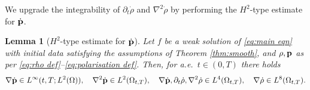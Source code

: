 \documentclass[11pt,a4paper,reqno]{amsart}
\newtheorem{lemma}[prop]{Lemma}
\theoremstyle{remark}
\theoremstyle{definition}
\numberwithin{equation}{section}
\newcommand{\p}{{\bf p}}
\begin{document}
We upgrade the integrability of $\partial_t \dot{\rho}$ and $\nabla^2\dot{\rho}$ by performing the $H^2$-type estimate for $\dot{\p}$. 

\begin{lemma}[$H^2$-type estimate for $\dot{\p}$]\label{lem:H2 dot p}
    Let $f$ be a weak solution of \eqref{eq:main eqn} with initial data satisfying the assumptions of Theorem \ref{thm:smooth}, and $\rho,\p$ as per \eqref{eq:rho def}--\eqref{eq:polarisation def}. Then, for a.e.~$t \in (0,T)$ there holds 
    \begin{equation*}
        \nabla \dot{\p} \in {L^\infty(t,T;L^2(\Omega))} , \quad \nabla^2 \dot{\p} \in {L^2(\Omega_{t,T})} , \quad \nabla \dot{\p}, \partial_t \dot{\rho},\nabla^2\dot{\rho} \in  L^4(\Omega_{t,T}), \quad \nabla \dot{\rho} \in L^8(\Omega_{t,T}). 
    \end{equation*}
\end{lemma}
\end{document}
